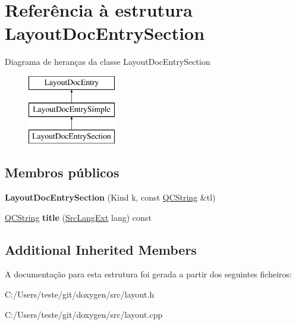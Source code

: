 \hypertarget{struct_layout_doc_entry_section}{\section{Referência à estrutura Layout\-Doc\-Entry\-Section}
\label{struct_layout_doc_entry_section}
}
Diagrama de heranças da classe Layout\-Doc\-Entry\-Section\begin{figure}[H]
\begin{center}
\leavevmode
\includegraphics[height=3.000000cm]{struct_layout_doc_entry_section}
\end{center}
\end{figure}
\subsection*{Membros públicos}
\begin{DoxyCompactItemize}
\item 
\hypertarget{struct_layout_doc_entry_section_a24a3d3db7eeb16a0aa048b5ce4dc4a44}{{\bfseries Layout\-Doc\-Entry\-Section} (Kind k, const \hyperlink{class_q_c_string}{Q\-C\-String} \&tl)}\label{struct_layout_doc_entry_section_a24a3d3db7eeb16a0aa048b5ce4dc4a44}

\item 
\hypertarget{struct_layout_doc_entry_section_a14d417557eb866a95f7bd071619d8ed9}{\hyperlink{class_q_c_string}{Q\-C\-String} {\bfseries title} (\hyperlink{types_8h_a9974623ce72fc23df5d64426b9178bf2}{Src\-Lang\-Ext} lang) const }\label{struct_layout_doc_entry_section_a14d417557eb866a95f7bd071619d8ed9}

\end{DoxyCompactItemize}
\subsection*{Additional Inherited Members}


A documentação para esta estrutura foi gerada a partir dos seguintes ficheiros\-:\begin{DoxyCompactItemize}
\item 
C\-:/\-Users/teste/git/doxygen/src/layout.\-h\item 
C\-:/\-Users/teste/git/doxygen/src/layout.\-cpp\end{DoxyCompactItemize}
